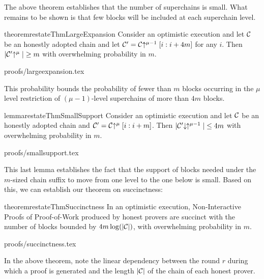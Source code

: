 The above theorem establishes that the number of superchains is small. What
remains to be shown is that few blocks will be included at each superchain
level.

\begin{restatable}{theorem}{restateThmLargeExpansion}
    \label{thm.large-expansion}
    Consider an optimistic execution and let $\mathcal{C}$ be an honestly adopted
    chain and let $\mathcal{C}' = \mathcal{C}\negthickspace\uparrow^{\mu - 1}[i:i + 4m]$ for any $i$.
    Then $|\mathcal{C}'\negthickspace\uparrow^\mu| \geq m$ with overwhelming probability in $m$.
\end{restatable}
\ifonecolumn
{proofs/largeexpansion.tex}
\fi

This probability bounds the probability of fewer than $m$ blocks occurring in
the $\mu$ level restriction of $(\mu - 1)$-level superchains of more than $4m$
blocks.

\begin{restatable}{lemma}{restateThmSmallSupport}
    \label{lem.small-support}
    Consider an optimistic execution and let $\mathcal{C}$ be an honestly adopted
    chain and $\mathcal{C}' = \mathcal{C}\negthickspace\uparrow^\mu[i:i + m]$. Then
    $|\mathcal{C}'\negthickspace\downarrow\,\negthickspace\uparrow^{\mu - 1}| \leq 4m$ with overwhelming
    probability in $m$.
\end{restatable}
\ifonecolumn
{proofs/smallsupport.tex}
\fi

This last lemma establishes the fact that the support of blocks needed under
the $m$-sized chain suffix to move from one level to the one below is small.
Based on this, we can establish our theorem on succinctness:

\begin{restatable}{theorem}{restateThmSuccinctness}
    \label{thm.succinctness}
    In an optimistic execution, Non-Interactive Proofs of Proof-of-Work produced
    by honest provers are succinct with the number of blocks bounded by $4m
    \log(|\mathcal{C}|)$, with overwhelming probability in $m$.
\end{restatable}
\ifonecolumn
{proofs/succinctness.tex}
\fi

In the above theorem, note the linear dependency between the round $r$ during
which a proof is generated and the length $|\mathcal{C}|$ of the chain of each honest
prover.
